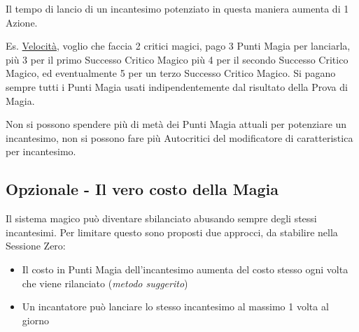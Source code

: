 \begin{multicols}{2}
Il tempo di lancio di un incantesimo potenziato in questa maniera aumenta di 1 Azione.

Es. \hyperlink{Velocità}{Velocità}, voglio che faccia 2 critici magici, pago 3 Punti Magia per lanciarla, più 3 per il primo Successo Critico Magico più 4 per il secondo Successo Critico Magico, ed eventualmente 5 per un terzo Successo Critico Magico. Si pagano sempre tutti i Punti Magia usati indipendentemente dal risultato della Prova di Magia.

Non si possono spendere più di metà dei Punti Magia attuali per potenziare un incantesimo, non si possono fare più Autocritici del modificatore di caratteristica per incantesimo.



\subsection{Opzionale - Il vero costo della Magia}

Il sistema magico può diventare sbilanciato abusando sempre degli stessi incantesimi. Per limitare questo sono proposti due approcci, da stabilire nella Sessione Zero:

\begin{itemize}[leftmargin=*] \setlength{\itemsep}{0pt}
\item Il costo in Punti Magia dell'incantesimo aumenta del costo stesso ogni volta che viene rilanciato (\emph{metodo suggerito})
\item Un incantatore può lanciare lo stesso incantesimo al massimo 1 volta al giorno
\end{itemize}


\end{multicols}
